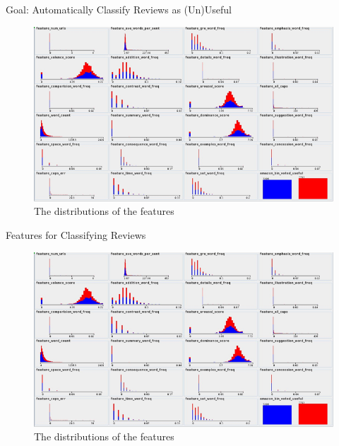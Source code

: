 \documentclass{beamer}
\begin{document}
\begin{frame}{Goal: Automatically Classify Reviews as (Un)Useful}
\begin{figure}[h]
  \centering
  \includegraphics[scale=.4]{features_distributions}
  \caption{The distributions of the features}
  \label{fig:dist}
\end{figure}
\end{frame}

\begin{frame}{Features for Classifying Reviews}
\begin{figure}[h]
  \centering
  \includegraphics[scale=.4]{features_distributions}
  \caption{The distributions of the features}
  \label{fig:dist}
\end{figure}
\end{frame}
\end{document}
